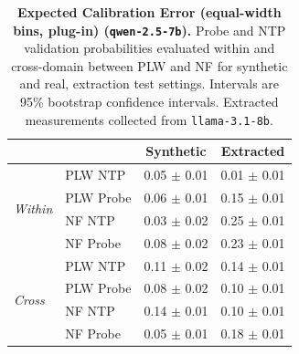 \begin{table}[ht]
\centering
\begin{tabular}{ll cc}
\toprule
& & Synthetic & Extracted \\
\midrule
\multirow{4}{*}{\textit{Within}}
& PLW NTP & 0.05 $\pm$ 0.01 & 0.01 $\pm$ 0.01 \\
& PLW Probe & 0.06 $\pm$ 0.01 & 0.15 $\pm$ 0.01 \\
& NF NTP & 0.03 $\pm$ 0.02 & 0.25 $\pm$ 0.01 \\
& NF Probe & 0.08 $\pm$ 0.02 & 0.23 $\pm$ 0.01 \\
\midrule
\multirow{4}{*}{\textit{Cross}}
& PLW NTP & 0.11 $\pm$ 0.02 & 0.14 $\pm$ 0.01 \\
& PLW Probe & 0.08 $\pm$ 0.02 & 0.10 $\pm$ 0.01 \\
& NF NTP & 0.14 $\pm$ 0.01 & 0.10 $\pm$ 0.01 \\
& NF Probe & 0.05 $\pm$ 0.01 & 0.18 $\pm$ 0.01 \\
\bottomrule
\end{tabular}
\caption{\textbf{Expected Calibration Error (equal-width bins, plug-in) (\texttt{qwen-2.5-7b}).} Probe and NTP validation probabilities evaluated within and cross-domain between PLW and NF for synthetic and real, extraction test settings. Intervals are 95\% bootstrap confidence intervals. Extracted measurements collected from \texttt{llama-3.1-8b}.}
\label{tab:qwen-2.5-7b-llama-3.1-8b-pond_nfix-ece}
\end{table}
